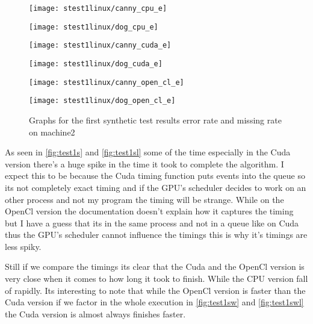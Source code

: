 \begin{figure}[H]
\centering
\begin{minipage}[t]{.49\textwidth}
\centering
\texttt{[image: stest1linux/canny\_cpu\_e]}
\end{minipage}
\begin{minipage}[t]{.49\textwidth}
\centering
\texttt{[image: stest1linux/dog\_cpu\_e]}
\end{minipage}
\begin{minipage}[t]{.49\textwidth}
\centering
\texttt{[image: stest1linux/canny\_cuda\_e]}
\end{minipage}
\begin{minipage}[t]{.49\textwidth}
\centering
\texttt{[image: stest1linux/dog\_cuda\_e]}
\end{minipage}
\begin{minipage}[t]{.49\textwidth}
\centering
\texttt{[image: stest1linux/canny\_open\_cl\_e]}
\end{minipage}
\begin{minipage}[t]{.49\textwidth}
\centering
\texttt{[image: stest1linux/dog\_open\_cl\_e]}
\end{minipage}
\caption{Graphs for the first synthetic test results error rate and missing rate on machine2}
\label{fig:test1sel}
\end{figure}

As seen in \autoref{fig:test1s} and \autoref{fig:test1sl} some of the time especially in the Cuda version there's a huge spike in the time it took to complete the algorithm. I expect this to be because the Cuda timing function puts events into the queue so its not completely exact timing and if the \ac{GPU}'s scheduler decides to work on an other process and not my program the timing will be strange. While on the OpenCl version the documentation doesn't explain how it captures the timing but I have a guess that its in the same process and not in a queue like on Cuda thus the \ac{GPU}'s scheduler cannot influence the timings this is why it's timings are less spiky. 

Still if we compare the timings its clear that the Cuda and the OpenCl version is very close when it comes to how long it took to finish. While the \ac{CPU} version fall of rapidly. Its interesting to note that while the OpenCl version is faster than the Cuda version if we factor in the whole execution in \autoref{fig:test1sw} and \autoref{fig:test1swl} the Cuda version is almost always finishes faster.

